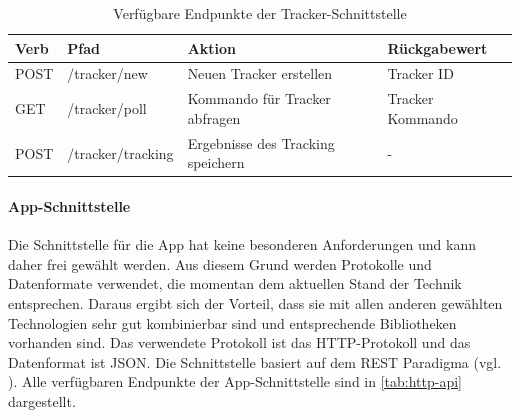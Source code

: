 \begin{table}[]
\begin{tabular}{l l l l}
\textbf{Verb} & \textbf{Pfad}     & \textbf{Aktion}                   & \textbf{Rückgabewert}    \\ \hline
POST          & /tracker/new      & Neuen Tracker erstellen           & Tracker ID \\ \hline
GET           & /tracker/poll     & Kommando für Tracker abfragen     & Tracker Kommando   \\ \hline
POST          & /tracker/tracking & Ergebnisse des Tracking speichern & -
\end{tabular}
\caption{\label{tab:coap-api}Verfügbare Endpunkte der Tracker-Schnittstelle}
\end{table}

\FloatBarrier
\paragraph{App-Schnittstelle} \label{par:app-schnittstelle}
Die Schnittstelle für die App hat keine besonderen Anforderungen und kann daher frei gewählt werden.
Aus diesem Grund werden Protokolle und Datenformate verwendet, die momentan dem aktuellen Stand der
Technik entsprechen.
Daraus ergibt sich der Vorteil, dass sie mit allen anderen gewählten Technologien sehr gut
kombinierbar sind und entsprechende Bibliotheken vorhanden sind.
Das verwendete Protokoll ist das \gls{HTTP}-Protokoll und das Datenformat ist \gls{JSON}.
Die Schnittstelle basiert auf dem \gls{REST} Paradigma (vgl. \cite{Fielding2000}). 
Alle verfügbaren Endpunkte der App-Schnittstelle sind in \autoref{tab:http-api} dargestellt.

